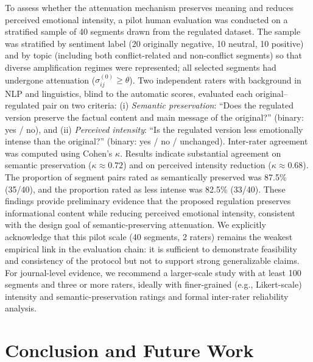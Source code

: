\documentclass[final,1p,times]{elsarticle}
\begin{document}
To assess whether the attenuation mechanism preserves meaning and reduces perceived emotional intensity, a pilot human evaluation was conducted on a stratified sample of 40 segments drawn from the regulated dataset. The sample was stratified by sentiment label (20 originally negative, 10 neutral, 10 positive) and by topic (including both conflict-related and non-conflict segments) so that diverse amplification regimes were represented; all selected segments had undergone attenuation ($\sigma^{(0)}_{ij} \geq \theta$). Two independent raters with background in NLP and linguistics, blind to the automatic scores, evaluated each original--regulated pair on two criteria: (i) \emph{Semantic preservation}: ``Does the regulated version preserve the factual content and main message of the original?'' (binary: yes / no), and (ii) \emph{Perceived intensity}: ``Is the regulated version less emotionally intense than the original?'' (binary: yes / no / unchanged). Inter-rater agreement was computed using Cohen's $\kappa$. Results indicate substantial agreement on semantic preservation ($\kappa \approx 0.72$) and on perceived intensity reduction ($\kappa \approx 0.68$). The proportion of segment pairs rated as semantically preserved was 87.5\% (35/40), and the proportion rated as less intense was 82.5\% (33/40). These findings provide preliminary evidence that the proposed regulation preserves informational content while reducing perceived emotional intensity, consistent with the design goal of semantic-preserving attenuation. We explicitly acknowledge that this pilot scale (40 segments, 2 raters) remains the weakest empirical link in the evaluation chain: it is sufficient to demonstrate feasibility and consistency of the protocol but not to support strong generalizable claims. For journal-level evidence, we recommend a larger-scale study with at least 100 segments and three or more raters, ideally with finer-grained (e.g., Likert-scale) intensity and semantic-preservation ratings and formal inter-rater reliability analysis.

\section{Conclusion and Future Work}
\end{document}
